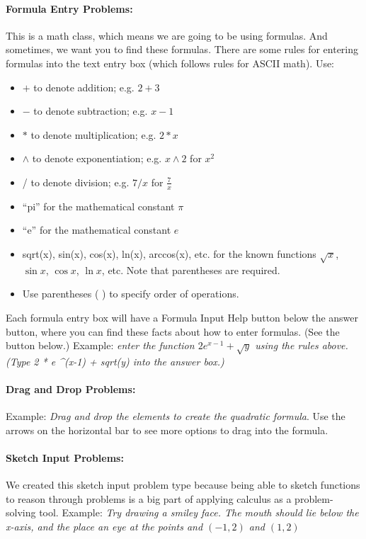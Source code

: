 \documentclass[pdftex, brazil, 12pt, twoside]{article}
\begin{document}
\paragraph{Formula Entry Problems:}
This is a math class, which means we are going to be using formulas. And sometimes, we want you to find these formulas. There are some rules for entering formulas into the text entry box (which follows rules for ASCII math). Use:

\begin{itemize}[noitemsep]
\item $+$ to denote addition; e.g. $2+3$
\item $-$ to denote subtraction; e.g. $x-1$
\item $*$ to denote multiplication; e.g. $2*x$
\item $\wedge$ to denote exponentiation; e.g. $x \wedge 2$ for $x^2$
\item / to denote division; e.g. $7/x$ for $\frac{7}{x}$
\item ``pi'' for the mathematical constant $\pi$
\item ``e'' for the mathematical constant $e$
\item sqrt(x), sin(x), cos(x), ln(x), arccos(x), etc. for the known functions $\sqrt{x}$, $\sin{x}$, $\cos{x}$, $\ln{x}$, etc. Note that parentheses are required.
\item Use parentheses ( ) to specify order of operations.
\end{itemize}

Each formula entry box will have a Formula Input Help button below the answer button, where you can find these facts about how to enter formulas. (See the button below.) Example: \emph{enter the function $2e^{x-1} + \sqrt{y}$ using the rules above. (Type 2 * e \textasciicircum (x-1) + sqrt(y) into the answer box.)}

\paragraph{Drag and Drop Problems:}
Example: \emph{Drag and drop the elements to create the quadratic formula}. 
Use the arrows on the horizontal bar to see more options to drag into the formula.

\paragraph{Sketch Input Problems:}
We created this sketch input problem type because being able to sketch functions to reason through problems is a big part of applying calculus as a problem-solving tool. Example: \emph{Try drawing a smiley face. The mouth should lie below the x-axis, and the place an eye at the points and $(-1, 2)$ and $(1, 2)$}
\end{document}
